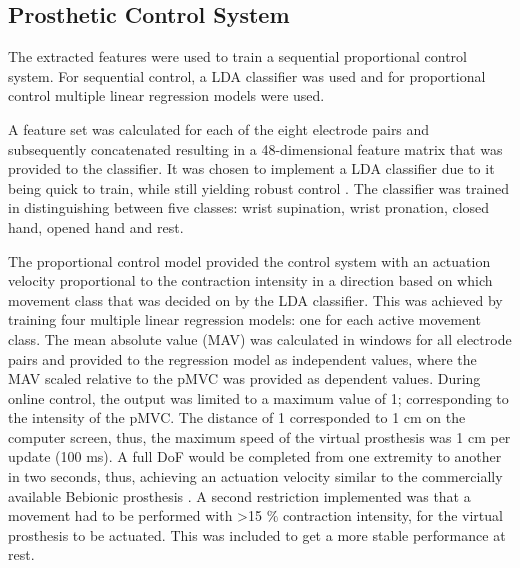 \subsection{Prosthetic Control System}

The extracted features were used to train a sequential proportional control system. For sequential control, a LDA classifier was used and for proportional control multiple linear regression models were used.

A feature set was calculated for each of the eight electrode pairs and subsequently concatenated resulting in a 48-dimensional feature matrix that was provided to the classifier. It was chosen to implement a LDA classifier due to it being quick to train, while still yielding robust control \cite{Englehart2003}. The classifier was trained in distinguishing between five classes: wrist supination, wrist pronation, closed hand, opened hand and rest.  

The proportional control model provided the control system with an actuation velocity proportional to the contraction intensity in a direction based on which movement class that was decided on by the LDA classifier. This was achieved by training four multiple linear regression models: one for each active movement class. The mean absolute value (MAV) was calculated in windows for all electrode pairs and provided to the regression model as independent values, where the MAV scaled relative to the pMVC was provided as dependent values. During online control, the output was limited to a maximum value of 1; corresponding to the intensity of the pMVC. The distance of 1 corresponded to 1 cm on the computer screen, thus, the maximum speed of the virtual prosthesis was 1 cm per update (100 ms). A full DoF would be completed from one extremity to another in two seconds, thus, achieving an actuation velocity similar to the commercially available Bebionic prosthesis \cite{Belter2013}. A second restriction implemented was that a movement had to be performed with >15 $\%$ contraction intensity, for the virtual prosthesis to be actuated. This was included to get a more stable performance at rest. 





